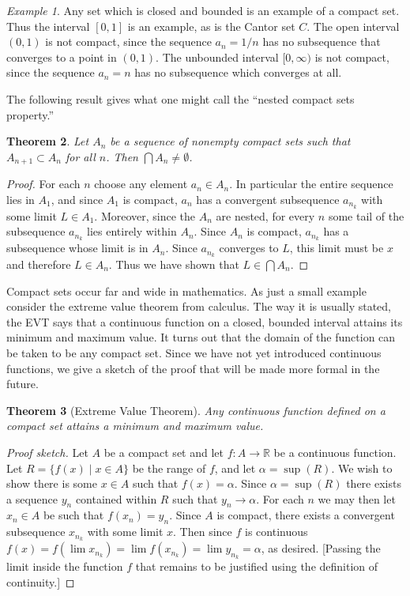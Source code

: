 \documentclass[11pt,oneside]{amsbook}
\newcommand{\RR}{\mathbb R}
\theoremstyle{definition}
\theoremstyle{plain}
\newtheorem{thm}{Theorem}[section]
\theoremstyle{definition}
\theoremstyle{remark}
\newtheorem{example}[thm]{Example}
\numberwithin{equation}{section}
\numberwithin{figure}{section}
\begin{document}
\begin{example}
  Any set which is closed and bounded is an example of a compact set. Thus the interval $[0,1]$ is an example, as is the Cantor set $C$. The open interval $(0,1)$ is not compact, since the sequence $a_n=1/n$ has no subsequence that converges to a point in $(0,1)$. The unbounded interval $[0,\infty)$ is not compact, since the sequence $a_n=n$ has no subsequence which converges at all.
\end{example}

The following result gives what one might call the ``nested compact sets property.''

\begin{thm}
  Let $A_n$ be a sequence of nonempty compact sets such that $A_{n+1}\subset A_n$ for all $n$. Then $\bigcap A_n\neq\emptyset$.
\end{thm}

\begin{proof}
  For each $n$ choose any element $a_n\in A_n$. In particular the entire sequence lies in $A_1$, and since $A_1$ is compact, $a_n$ has a convergent subsequence $a_{n_k}$ with some limit $L\in A_1$. Moreover, since the $A_n$ are nested, for every $n$ some tail of the subsequence $a_{n_k}$ lies entirely within $A_n$. Since $A_n$ is compact, $a_{n_k}$ has a subsequence whose limit is in $A_n$. Since $a_{n_k}$ converges to $L$, this limit must be $x$ and therefore $L\in A_n$. Thus we have shown that $L\in\bigcap A_n$.
\end{proof}

Compact sets occur far and wide in mathematics. As just a small example consider the extreme value theorem from calculus. The way it is usually stated, the EVT says that a continuous function on a closed, bounded interval attains its minimum and maximum value. It turns out that the domain of the function can be taken to be any compact set. Since we have not yet introduced continuous functions, we give a sketch of the proof that will be made more formal in the future.

\begin{thm}[Extreme Value Theorem]
  Any continuous function defined on a compact set attains a minimum and maximum value.
\end{thm}

\begin{proof}[Proof sketch]
  Let $A$ be a compact set and let $f\colon A\to\RR$ be a continuous function. Let $R=\{f(x)\mid x\in A\}$ be the range of $f$, and let $\alpha=\sup(R)$. We wish to show there is some $x\in A$ such that $f(x)=\alpha$. Since $\alpha=\sup(R)$ there exists a sequence $y_n$ contained within $R$ such that $y_n\to\alpha$. For each $n$ we may then let $x_n\in A$ be such that $f(x_n)=y_n$. Since $A$ is compact, there exists a convergent subsequence $x_{n_k}$ with some limit $x$. Then since $f$ is continuous $f(x)=f(\lim x_{n_k})=\lim f(x_{n_k})=\lim y_{n_k}=\alpha$, as desired. [Passing the limit inside the function $f$ that remains to be justified using the definition of continuity.]
\end{proof}
\end{document}
